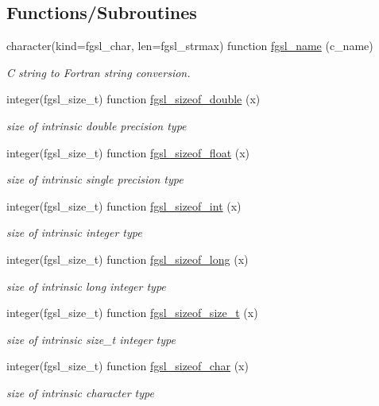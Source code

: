 \subsection*{Functions/\+Subroutines}
\begin{DoxyCompactItemize}
\item 
character(kind=fgsl\+\_\+char, len=fgsl\+\_\+strmax) function \hyperlink{misc_8finc_a014cd02b3b4d29919fd8e1947a2673d0}{fgsl\+\_\+name} (c\+\_\+name)
\begin{DoxyCompactList}\small\item\em C string to Fortran string conversion. \end{DoxyCompactList}\item 
integer(fgsl\+\_\+size\+\_\+t) function \hyperlink{misc_8finc_a896bd2c97151708c197858a357ea50e2}{fgsl\+\_\+sizeof\+\_\+double} (x)
\begin{DoxyCompactList}\small\item\em size of intrinsic double precision type \end{DoxyCompactList}\item 
integer(fgsl\+\_\+size\+\_\+t) function \hyperlink{misc_8finc_a993f009131d0e6bf9bcdebe827162450}{fgsl\+\_\+sizeof\+\_\+float} (x)
\begin{DoxyCompactList}\small\item\em size of intrinsic single precision type \end{DoxyCompactList}\item 
integer(fgsl\+\_\+size\+\_\+t) function \hyperlink{misc_8finc_abea36929b3d5a33cb24fbca3f52e6aa2}{fgsl\+\_\+sizeof\+\_\+int} (x)
\begin{DoxyCompactList}\small\item\em size of intrinsic integer type \end{DoxyCompactList}\item 
integer(fgsl\+\_\+size\+\_\+t) function \hyperlink{misc_8finc_ac74c9d7b9d14a74b9b32796d620f685f}{fgsl\+\_\+sizeof\+\_\+long} (x)
\begin{DoxyCompactList}\small\item\em size of intrinsic long integer type \end{DoxyCompactList}\item 
integer(fgsl\+\_\+size\+\_\+t) function \hyperlink{misc_8finc_a4befb04b07c33f2dc158a1349971d416}{fgsl\+\_\+sizeof\+\_\+size\+\_\+t} (x)
\begin{DoxyCompactList}\small\item\em size of intrinsic size\+\_\+t integer type \end{DoxyCompactList}\item 
integer(fgsl\+\_\+size\+\_\+t) function \hyperlink{misc_8finc_a703e0d9c10d808494cfa6597f403d8e3}{fgsl\+\_\+sizeof\+\_\+char} (x)
\begin{DoxyCompactList}\small\item\em size of intrinsic character type \end{DoxyCompactList}\end{DoxyCompactItemize}


